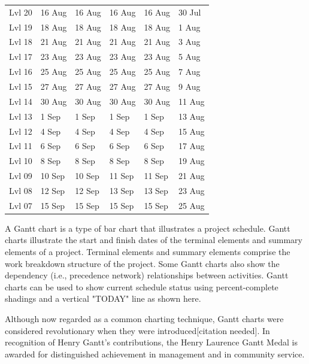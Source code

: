\begin{table}[p]
\begin{tabular}{llllll}
Lvl 20  & 16 Aug   &16 Aug          &16 Aug         &16 Aug         &30 Jul\\
Lvl 19  & 18 Aug   &18 Aug           &18 Aug         &18 Aug         &1 Aug\\
Lvl 18  & 21 Aug   &21 Aug & 21 Aug                  &21 Aug         &3 Aug\\
Lvl 17  & 23 Aug   &23 Aug  &23 Aug         &23 Aug         &5 Aug\\
Lvl 16  & 25 Aug   &25 Aug  &25 Aug         &25 Aug         &7 Aug\\
Lvl 15  & 27 Aug   &27 Aug  &27 Aug         &27 Aug         &9 Aug\\
Lvl 14  & 30 Aug   &30 Aug  &30 Aug         &30 Aug         &11 Aug\\
Lvl 13  & 1 Sep     &1 Sep  &1 Sep         &1 Sep         &13 Aug\\
Lvl 12  & 4 Sep     &4 Sep  & 4 Sep        &4 Sep         &15 Aug\\
Lvl 11  & 6 Sep     &6 Sep  & 6 Sep        &6 Sep         &17 Aug\\
Lvl 10  & 8 Sep     &8 Sep  & 8 Sep        &8 Sep         &19 Aug\\
Lvl 09  & 10 Sep   &10 Sep  & 11 Sep        &11 Sep         &21 Aug\\
Lvl 08  & 12 Sep   &12 Sep  & 13 Sep        &13 Sep         &23 Aug\\
Lvl 07  & 15 Sep   &15 Sep  & 15 Sep        &15 Sep         &25 Aug\\
\bottomrule
\end{tabular}
\normalsize
\label{towerplan}
\end{table}
\normalsize

A Gantt chart is a type of bar chart that illustrates a project schedule. Gantt charts illustrate the start and finish dates of the terminal elements and summary elements of a project. Terminal elements and summary elements comprise the work breakdown structure of the project. Some Gantt charts also show the dependency (i.e., precedence network) relationships between activities. Gantt charts can be used to show current schedule status using percent-complete shadings and a vertical "TODAY" line as shown here.

Although now regarded as a common charting technique, Gantt charts were considered revolutionary when they were introduced[citation needed]. In recognition of Henry Gantt's contributions, the Henry Laurence Gantt Medal is awarded for distinguished achievement in management and in community service. 

